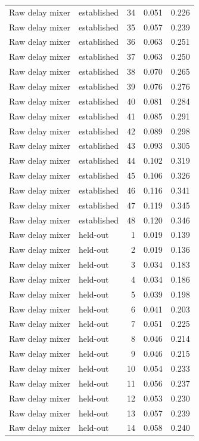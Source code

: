 \begin{tabular}{llrrr}
Raw delay mixer & established & 34 & 0.051 & 0.226 \\
Raw delay mixer & established & 35 & 0.057 & 0.239 \\
Raw delay mixer & established & 36 & 0.063 & 0.251 \\
Raw delay mixer & established & 37 & 0.063 & 0.250 \\
Raw delay mixer & established & 38 & 0.070 & 0.265 \\
Raw delay mixer & established & 39 & 0.076 & 0.276 \\
Raw delay mixer & established & 40 & 0.081 & 0.284 \\
Raw delay mixer & established & 41 & 0.085 & 0.291 \\
Raw delay mixer & established & 42 & 0.089 & 0.298 \\
Raw delay mixer & established & 43 & 0.093 & 0.305 \\
Raw delay mixer & established & 44 & 0.102 & 0.319 \\
Raw delay mixer & established & 45 & 0.106 & 0.326 \\
Raw delay mixer & established & 46 & 0.116 & 0.341 \\
Raw delay mixer & established & 47 & 0.119 & 0.345 \\
Raw delay mixer & established & 48 & 0.120 & 0.346 \\
Raw delay mixer & held-out & 1 & 0.019 & 0.139 \\
Raw delay mixer & held-out & 2 & 0.019 & 0.136 \\
Raw delay mixer & held-out & 3 & 0.034 & 0.183 \\
Raw delay mixer & held-out & 4 & 0.034 & 0.186 \\
Raw delay mixer & held-out & 5 & 0.039 & 0.198 \\
Raw delay mixer & held-out & 6 & 0.041 & 0.203 \\
Raw delay mixer & held-out & 7 & 0.051 & 0.225 \\
Raw delay mixer & held-out & 8 & 0.046 & 0.214 \\
Raw delay mixer & held-out & 9 & 0.046 & 0.215 \\
Raw delay mixer & held-out & 10 & 0.054 & 0.233 \\
Raw delay mixer & held-out & 11 & 0.056 & 0.237 \\
Raw delay mixer & held-out & 12 & 0.053 & 0.230 \\
Raw delay mixer & held-out & 13 & 0.057 & 0.239 \\
Raw delay mixer & held-out & 14 & 0.058 & 0.240 \\

\end{tabular}

